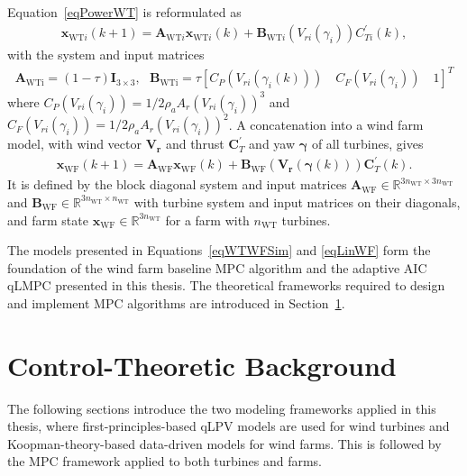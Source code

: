 Equation~\eqref{eqPowerWT} is reformulated as
\begin{align} \label{eqWTWFSim}
    \bm{x}_{\text{WT}i}(k+1) =\bm{A}_{\text{WT}i} \bm{x}_{\text{WT}i}(k) +\bm{B}_{\text{WT}i}(V_{ri}(\gamma_i))C_{Ti}^\prime(k), 
\end{align}
with the system and input matrices
\begin{align*}
    \bm{A}_{\text{WTi}} = (1-\tau)\bm{I}_{3\times3},\text{ }\bm{B}_{\text{WTi}} = \tau[ C_P(V_{ri}(\gamma_i(k))) \quad C_F(V_{ri}(\gamma_i)) \quad 1]^T
\end{align*}
where $C_P(V_{ri}(\gamma_i)) = 1/2 \rho_a A_r (V_{ri}(\gamma_{i}))^3$ and $C_F(V_{ri}(\gamma_i)) = 1/2 \rho_a A_r (V_{ri}(\gamma_{i}))^2$.
A concatenation into a wind farm model, with wind vector $\bm{V_r}$ and thrust $\bm{C}_{T}^\prime$ and yaw $\bm{\gamma}$ of all turbines, gives 
\begin{align} \label{eqLinWF}
    \bm{x}_{\text{WF}}(k+1) = \bm{A}_{\text{WF}} \bm{x}_{\text{WF}}(k) + \bm{B}_{\text{WF}}(\bm{V_r}(\bm{\gamma}(k))) \bm{C}_{T}^\prime (k).
\end{align}
It is defined by the block diagonal system and input matrices $\bm{A}_{\text{WF}} \in {\mathbb{R}}^{3n_{\text{WT}} \times 3n_{\text{WT}}}$ and $\bm{B}_{\text{WF}} \in {\mathbb{R}}^{3n_{\text{WT}} \times n_{\text{WT}}}$ with turbine system and input matrices on their diagonals, and farm state $\bm{x}_{\text{WF}} \in {\mathbb{R}}^{3n_{\text{WT}}}$ for a farm with $n_{\text{WT}}$ turbines.

The models presented in Equations~\eqref{eqWTWFSim} and \eqref{eqLinWF} form the foundation of the wind farm baseline MPC algorithm and the adaptive AIC qLMPC presented in this thesis. The theoretical frameworks required to design and implement MPC algorithms are introduced in Section~\ref{sec:Control-Theoretic Background}.

\section{Control-Theoretic Background}\label{sec:Control-Theoretic Background}
The following sections introduce the two modeling frameworks applied in this thesis, where first-principles-based qLPV models are used for wind turbines and Koopman-theory-based data-driven models for wind farms. This is followed by the MPC framework applied to both turbines and farms.

